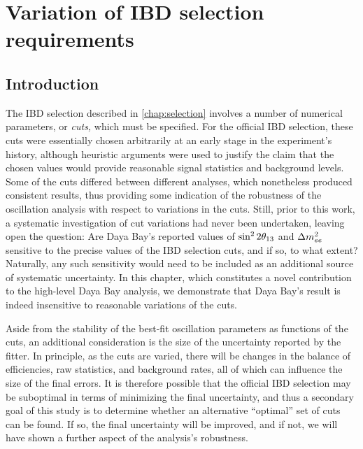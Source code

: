 \documentclass[../thesis.tex]{subfiles}
\begin{document}
\chapter{Variation of IBD selection requirements}
\label{chap:cutVary}

\section{Introduction}
\label{sec:cutVaryIntro}


The IBD selection described in \autoref{chap:selection} involves a number of numerical parameters, or \emph{cuts,} which must be specified. For the official IBD selection, these cuts were essentially chosen arbitrarily at an early stage in the experiment's history, although heuristic arguments were used to justify the claim that the chosen values would provide reasonable signal statistics and background levels. Some of the cuts differed between different analyses, which nonetheless produced consistent results, thus providing some indication of the robustness of the oscillation analysis with respect to variations in the cuts. Still, prior to this work, a systematic investigation of cut variations had never been undertaken, leaving open the question: Are Daya Bay's reported values of $\sin^2 2\theta_{13}$ and $\Delta m^2_{ee}$ sensitive to the precise values of the IBD selection cuts, and if so, to what extent? Naturally, any such sensitivity would need to be included as an additional source of systematic uncertainty. In this chapter, which constitutes a novel contribution to the high-level Daya Bay analysis, we demonstrate that Daya Bay's result is indeed insensitive to reasonable variations of the cuts.

Aside from the stability of the best-fit oscillation parameters as functions of the cuts, an additional consideration is the size of the uncertainty reported by the fitter. In principle, as the cuts are varied, there will be changes in the balance of efficiencies, raw statistics, and background rates, all of which can influence the size of the final errors. It is therefore possible that the official IBD selection may be suboptimal in terms of minimizing the final uncertainty, and thus a secondary goal of this study is to determine whether an alternative ``optimal'' set of cuts can be found. If so, the final uncertainty will be improved, and if not, we will have shown a further aspect of the analysis's robustness.
\end{document}
